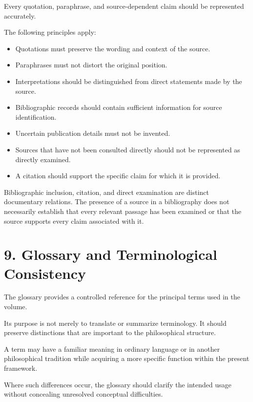Every quotation, paraphrase, and source-dependent
claim should be represented accurately.

The following principles apply:

\begin{itemize}
    \item Quotations must preserve the wording
    and context of the source.
    \item Paraphrases must not distort the
    original position.
    \item Interpretations should be distinguished
    from direct statements made by the source.
    \item Bibliographic records should contain
    sufficient information for source identification.
    \item Uncertain publication details must
    not be invented.
    \item Sources that have not been consulted
    directly should not be represented as directly
    examined.
    \item A citation should support the specific
    claim for which it is provided.
\end{itemize}

Bibliographic inclusion, citation, and direct
examination are distinct documentary relations.
The presence of a source in a bibliography
does not necessarily establish that every
relevant passage has been examined or that
the source supports every claim associated
with it.


\section*{9. Glossary and Terminological Consistency}

The glossary provides a controlled reference
for the principal terms used in the volume.

Its purpose is not merely to translate or
summarize terminology. It should preserve
distinctions that are important to the
philosophical structure.

A term may have a familiar meaning in ordinary
language or in another philosophical tradition
while acquiring a more specific function within
the present framework.

Where such differences occur, the glossary
should clarify the intended usage without
concealing unresolved conceptual difficulties.

